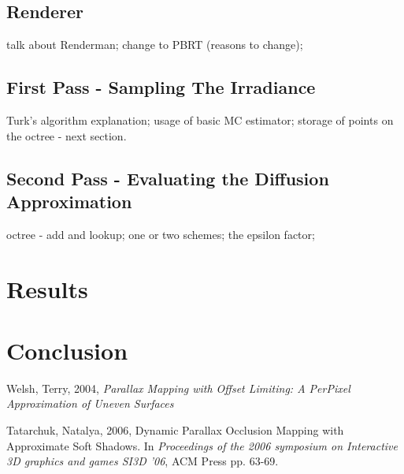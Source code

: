 \documentclass{article}
\begin{document}
\subsection{Renderer}
talk about Renderman; change to PBRT (reasons to change);
\subsection{First Pass - Sampling The Irradiance}
Turk's algorithm explanation; usage of basic MC estimator; storage of points on the octree - next section.

\subsection{Second Pass - Evaluating the Diffusion Approximation}
octree - add and lookup; one or two schemes; the epsilon factor;

\section{Results}
\section{Conclusion}

\begin{thebibliography}{99}

%
%

 Welsh, Terry, 2004, {\it Parallax Mapping with Offset Limiting: A PerPixel Approximation of Uneven Surfaces}

 Tatarchuk, Natalya, 2006, Dynamic Parallax Occlusion Mapping with Approximate Soft Shadows. In {\it Proceedings of the 2006 symposium on Interactive 3D graphics and games SI3D '06}, ACM Press pp. 63-69.

\end{thebibliography}
\end{document}
